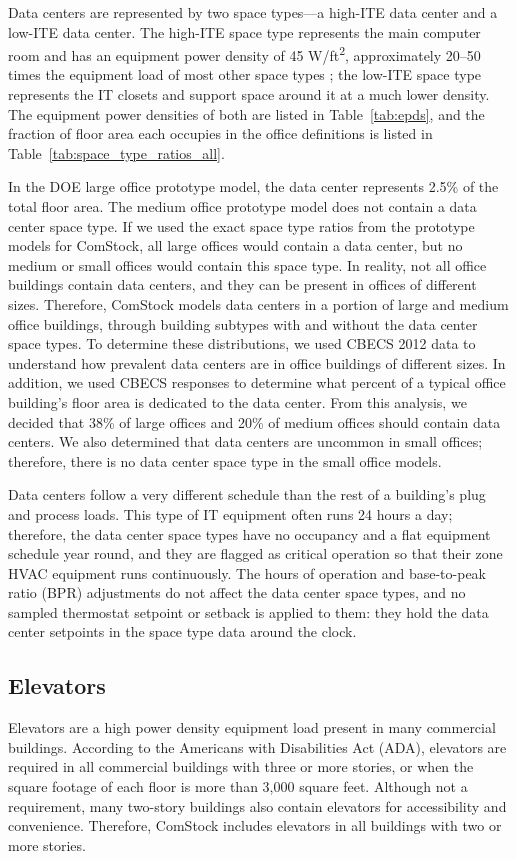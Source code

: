 Data centers are represented by two space types---a high-ITE data center and a low-ITE data center. The high-ITE space type represents the main computer room and has an equipment power density of 45 W/ft\textsuperscript{2}, approximately 20--50 times the equipment load of most other space types \citep{osti_1129366}; the low-ITE space type represents the IT closets and support space around it at a much lower density. The equipment power densities of both are listed in Table~\ref{tab:epds}, and the fraction of floor area each occupies in the office definitions is listed in Table~\ref{tab:space_type_ratios_all}.

In the DOE large office prototype model, the data center represents 2.5\% of the total floor area. The medium office prototype model does not contain a data center space type. If we used the exact space type ratios from the prototype models for ComStock, all large offices would contain a data center, but no medium or small offices would contain this space type. In reality, not all office buildings contain data centers, and they can be present in offices of different sizes. Therefore, ComStock models data centers in a portion of large and medium office buildings, through building subtypes with and without the data center space types. To determine these distributions, we used CBECS 2012 data to understand how prevalent data centers are in office buildings of different sizes. In addition, we used CBECS responses to determine what percent of a typical office building's floor area is dedicated to the data center. From this analysis, we decided that 38\% of large offices and 20\% of medium offices should contain data centers. We also determined that data centers are uncommon in small offices; therefore, there is no data center space type in the small office models.

Data centers follow a very different schedule than the rest of a building's plug and process loads. This type of IT equipment often runs 24 hours a day; therefore, the data center space types have no occupancy and a flat equipment schedule year round, and they are flagged as critical operation so that their zone HVAC equipment runs continuously. The hours of operation and base-to-peak ratio (BPR) adjustments do not affect the data center space types, and no sampled thermostat setpoint or setback is applied to them: they hold the data center setpoints in the space type data around the clock.

\subsection{Elevators}
Elevators are a high power density equipment load present in many commercial buildings. According to the Americans with Disabilities Act (ADA), elevators are required in all commercial buildings with three or more stories, or when the square footage of each floor is more than 3,000 square feet. Although not a requirement, many two-story buildings also contain elevators for accessibility and convenience. Therefore, ComStock includes elevators in all buildings with two or more stories.

